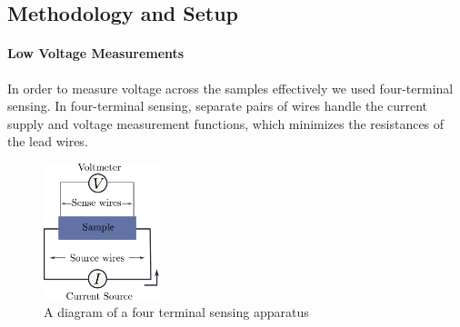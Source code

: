 \documentclass[prl,twocolumn,superscriptaddress,floatfix]{revtex4}
\begin{document}

    

\subsection{Methodology and Setup}


\paragraph{Low Voltage Measurements}
In order to measure voltage across the samples effectively we used four-terminal sensing.
In four-terminal sensing, separate pairs of wires handle the current supply and voltage measurement functions,
which minimizes the resistances of the lead wires.

\begin{figure}[ht]
    \begin{center}
    \includegraphics[width = 0.3\textwidth]{4terma.pdf}
    \caption{A diagram of a four terminal sensing apparatus}
    \label{fig:4term}
    \end{center}
\end{figure}
\end{document}
